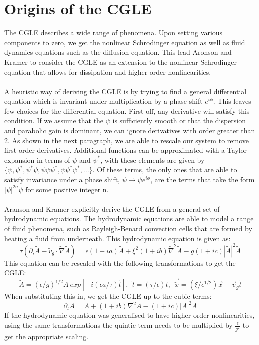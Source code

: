 \documentclass[a4paper,12pt]{report}
\begin{document}
\section{Origins of the CGLE}
The CGLE describes a wide range of phenomena. Upon setting various components to zero, we get the nonlinear Schrodinger equation as well as fluid dynamics equations such as the diffusion equation. This lead Aronson and Kramer\cite{wocgle} to consider the CGLE as an extension to the nonlinear Schrodinger equation that allows for dissipation and higher order nonlinearities.  
\\
\\
A heuristic way of deriving the CGLE is by trying to find a general differential equation which is invariant under multiplication by a phase shift $e^{i\phi}$.\cite{hecke} This leaves few choices for the differential equation. 
First off, any derivative will satisfy this condition. If we assume that the $\psi$ is sufficiently smooth or that the dispersion and parabolic gain is dominant, we can ignore derivatives with order greater than 2. As shown in the next paragraph, we are able to rescale our system to remove first order derivatives. Additional functions can be approximated with a Taylor expansion in terms of $\psi$ and $\psi^*$, with these elements are given by $\{\psi,\psi^*, \psi^*\psi, \psi\psi\psi^*,\psi\psi^*\psi^*, ...\}$. Of these terms, the only ones that are able to satisfy invariance under a phase shift, $\psi\rightarrow \psi e^{i\phi}$, are the terms that take the form $|\psi|^{2n}\psi$ for some positive integer n. 
\\
\\
Aranson and Kramer\cite{wocgle} explicitly derive the CGLE from a general set of hydrodynamic equations. The hydrodynamic equations are able to model a range of fluid phenomena, such as Rayleigh-Benard convection cells that are formed by heating a fluid from underneath. This hydrodynamic equation is given as:
$$\tau (\partial_{\tilde t}\tilde A-\tilde v_g\cdot \tilde\nabla \tilde A)=\epsilon(1+ia)\tilde A+\xi^2(1+ib)\tilde\nabla^2 \tilde A-g(1+ic)|\tilde A|^2 \tilde A$$ 
This equation can be rescaled with the following transformations to get the CGLE: 
$$\tilde A=(\epsilon/g)^{1/2} A \ exp[-i (\epsilon a/\tau)\tilde t], \ \ \tilde t = (\tau/\epsilon)t, \ \ \vec {\tilde x} = (\xi/\epsilon^{1/2})\vec x+\vec v_g \tilde t$$
When substituting this in, we get the CGLE up to the cubic terms:
$$\partial_t A=A+(1+ib)\nabla^2A-(1+ic)|A|^2A$$
If the hydrodynamic equation was generalised to have higher order nonlinearities, using the same transformations the quintic term needs to be multiplied by $ \frac{\epsilon}{g^2} $ to get the appropriate scaling.
\end{document}
